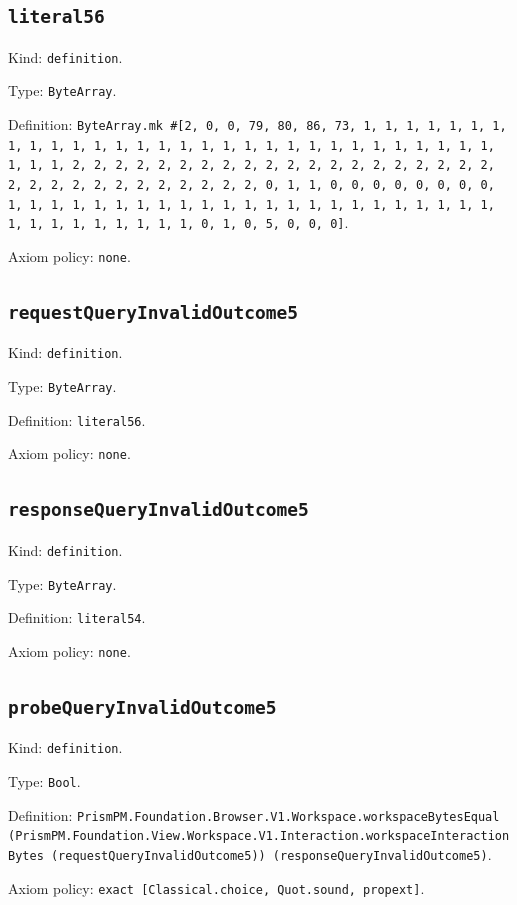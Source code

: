 \documentclass[11pt]{article}
\begin{document}
\subsection*{\texttt{literal56}}
\noindent Kind: \texttt{definition}.\par
\noindent Type: \texttt{ByteArray}.\par
\noindent Definition: \texttt{ByteArray.mk \#[2, 0, 0, 79, 80, 86, 73, 1, 1, 1, 1, 1, 1, 1, 1, 1, 1, 1, 1, 1, 1, 1, 1, 1, 1, 1, 1, 1, 1, 1, 1, 1, 1, 1, 1, 1, 1, 1, 1, 1, 2, 2, 2, 2, 2, 2, 2, 2, 2, 2, 2, 2, 2, 2, 2, 2, 2, 2, 2, 2, 2, 2, 2, 2, 2, 2, 2, 2, 2, 2, 2, 2, 0, 1, 1, 0, 0, 0, 0, 0, 0, 0, 0, 1, 1, 1, 1, 1, 1, 1, 1, 1, 1, 1, 1, 1, 1, 1, 1, 1, 1, 1, 1, 1, 1, 1, 1, 1, 1, 1, 1, 1, 1, 1, 1, 0, 1, 0, 5, 0, 0, 0]}.\par
\noindent Axiom policy: \texttt{none}.\par
\subsection*{\texttt{requestQueryInvalidOutcome5}}
\noindent Kind: \texttt{definition}.\par
\noindent Type: \texttt{ByteArray}.\par
\noindent Definition: \texttt{literal56}.\par
\noindent Axiom policy: \texttt{none}.\par
\subsection*{\texttt{responseQueryInvalidOutcome5}}
\noindent Kind: \texttt{definition}.\par
\noindent Type: \texttt{ByteArray}.\par
\noindent Definition: \texttt{literal54}.\par
\noindent Axiom policy: \texttt{none}.\par
\subsection*{\texttt{probeQueryInvalidOutcome5}}
\noindent Kind: \texttt{definition}.\par
\noindent Type: \texttt{Bool}.\par
\noindent Definition: \texttt{PrismPM.Foundation.Browser.V1.Workspace.workspaceBytesEqual (PrismPM.Foundation.View.Workspace.V1.Interaction.workspaceInteractionBytes (requestQueryInvalidOutcome5)) (responseQueryInvalidOutcome5)}.\par
\noindent Axiom policy: \texttt{exact [Classical.choice, Quot.sound, propext]}.\par
\end{document}

